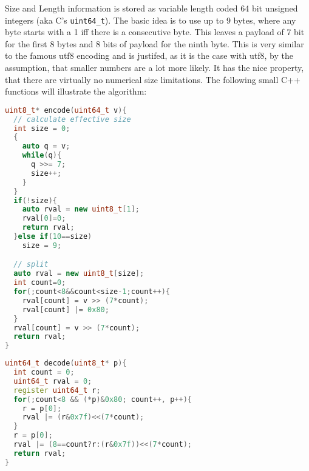 \documentclass[a4paper,10pt]{article}
\begin{document}
Size and Length information is stored as variable length coded 64 bit unsigned integers (aka C's \texttt{uint64\_t}). The basic idea is to use up to 9 bytes, where any byte starts with a 1 iff there is a consecutive byte. This leaves a payload of 7 bit for the first 8 bytes and 8 bits of payload for the ninth byte. This is very similar to the famous utf8 encoding and is justifed, as it is the case with utf8, by the assumption, that smaller numbers are a lot more likely. It has the nice property, that there are virtually no numerical size limitations.
The following small C++ functions will illustrate the algorithm:
\begin{lstlisting}[label=v64enc,caption=Variable Length Encoding,language=C++]
uint8_t* encode(uint64_t v){
  // calculate effective size
  int size = 0;
  {
    auto q = v;
    while(q){
      q >>= 7;
      size++;
    }
  }
  if(!size){
    auto rval = new uint8_t[1];
    rval[0]=0;
    return rval;
  }else if(10==size)
    size = 9;

  // split
  auto rval = new uint8_t[size];
  int count=0;
  for(;count<8&&count<size-1;count++){
    rval[count] = v >> (7*count);
    rval[count] |= 0x80;
  }
  rval[count] = v >> (7*count);
  return rval;
}
\end{lstlisting}
\begin{lstlisting}[label=v64dec,caption=Variable Length Decoding,language=C++]
uint64_t decode(uint8_t* p){
  int count = 0;
  uint64_t rval = 0;
  register uint64_t r;
  for(;count<8 && (*p)&0x80; count++, p++){
    r = p[0];
    rval |= (r&0x7f)<<(7*count);
  }
  r = p[0];
  rval |= (8==count?r:(r&0x7f))<<(7*count);
  return rval;
}
\end{lstlisting}
\end{document}
